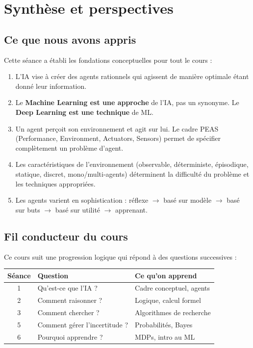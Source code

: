 \documentclass[11pt,a4paper]{article}
\begin{document}
\section{Synthèse et perspectives}

\subsection{Ce que nous avons appris}

Cette séance a établi les fondations conceptuelles pour tout le cours :

\begin{retenirbox}
\begin{enumerate}
    \item L'IA vise à créer des agents rationnels qui agissent de manière optimale étant donné leur information.
    \item Le \textbf{Machine Learning est une approche} de l'IA, pas un synonyme. Le \textbf{Deep Learning est une technique} de ML.
    \item Un agent perçoit son environnement et agit sur lui. Le cadre PEAS (Performance, Environment, Actuators, Sensors) permet de spécifier complètement un problème d'agent.
    \item Les caractéristiques de l'environnement (observable, déterministe, épisodique, statique, discret, mono/multi-agents) déterminent la difficulté du problème et les techniques appropriées.
    \item Les agents varient en sophistication : réflexe $\rightarrow$ basé sur modèle $\rightarrow$ basé sur buts $\rightarrow$ basé sur utilité $\rightarrow$ apprenant.
\end{enumerate}
\end{retenirbox}

\subsection{Fil conducteur du cours}

Ce cours suit une progression logique qui répond à des questions successives :

\begin{center}
\begin{tabular}{|c|l|l|}
\hline
\textbf{Séance} & \textbf{Question} & \textbf{Ce qu'on apprend} \\
\hline
1 & Qu'est-ce que l'IA ? & Cadre conceptuel, agents \\
2 & Comment raisonner ? & Logique, calcul formel \\
3 & Comment chercher ? & Algorithmes de recherche \\
5 & Comment gérer l'incertitude ? & Probabilités, Bayes \\
6 & Pourquoi apprendre ? & MDPs, intro au ML \\
\hline
\end{tabular}
\end{center}
\end{document}
